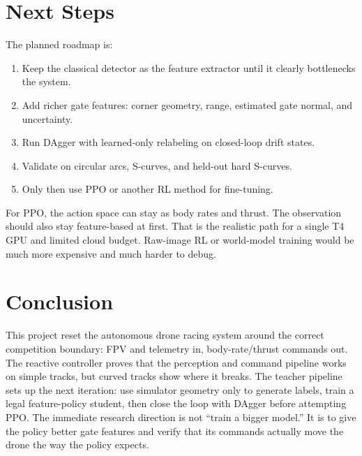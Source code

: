 \documentclass[11pt]{article}
\begin{document}
\section{Next Steps}

The planned roadmap is:

\begin{enumerate}
  \item Keep the classical detector as the feature extractor until it clearly bottlenecks the system.
  \item Add richer gate features: corner geometry, range, estimated gate normal, and uncertainty.
  \item Run DAgger with learned-only relabeling on closed-loop drift states.
  \item Validate on circular arcs, S-curves, and held-out hard S-curves.
  \item Only then use PPO or another RL method for fine-tuning.
\end{enumerate}

For PPO, the action space can stay as body rates and thrust. The observation should also stay feature-based at first. That is the realistic path for a single T4 GPU and limited cloud budget. Raw-image RL or world-model training would be much more expensive and much harder to debug.

\section{Conclusion}

This project reset the autonomous drone racing system around the correct competition boundary: FPV and telemetry in, body-rate/thrust commands out. The reactive controller proves that the perception and command pipeline works on simple tracks, but curved tracks show where it breaks. The teacher pipeline sets up the next iteration: use simulator geometry only to generate labels, train a legal feature-policy student, then close the loop with DAgger before attempting PPO. The immediate research direction is not ``train a bigger model.'' It is to give the policy better gate features and verify that its commands actually move the drone the way the policy expects.
\end{document}
